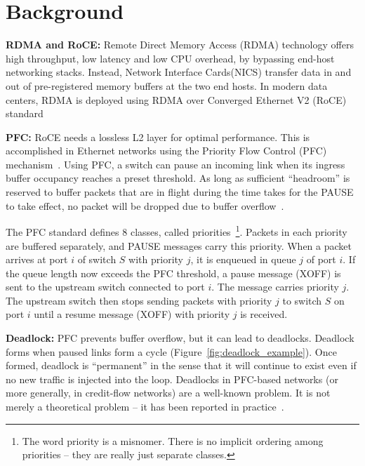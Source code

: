 \section{Background}
\label{sec:background}
{\bf RDMA and RoCE:} Remote Direct Memory Access (RDMA) technology offers high
throughput, low latency and low CPU overhead, by bypassing end-host networking
stacks. Instead, Network Interface Cards(NICS) transfer data in and out of
pre-registered memory buffers at the two end hosts.  In modern data centers,
RDMA is deployed using RDMA over Converged Ethernet V2 (RoCE)
standard~\cite{roce,rroce}

{\bf PFC:} RoCE needs a lossless L2 layer for optimal performance. This is
accomplished in Ethernet networks using the Priority Flow Control (PFC)
mechanism~\cite{pfc}.  Using PFC, a switch can pause an incoming link when its
ingress buffer occupancy reaches a preset threshold. As long as sufficient
``headroom'' is reserved to buffer packets that are in flight during the time
takes for the PAUSE to take effect, no packet will be dropped due to buffer
overflow~\cite{cisco-whitepaper,dcqcn}. 

The PFC standard defines 8 classes, called priorities~\footnote{The word priority is a
misnomer. There is no implicit ordering among priorities -- they are really just
separate classes.}. Packets in each priority are buffered separately, and PAUSE
messages carry this priority.  When a packet arrives at port $i$ of switch $S$
with priority $j$, it is enqueued in queue $j$ of port $i$. If the queue length
now exceeds the PFC threshold, a pause message (XOFF) is sent to the upstream
switch connected to port $i$. The message carries priority $j$. The upstream
switch then stops sending packets with priority $j$ to switch $S$ on port $i$ until a resume
message (XOFF) with priority $j$ is received.



{\bf Deadlock:} PFC prevents buffer overflow, but it can lead to deadlocks.
Deadlock forms when paused links form a cycle
(Figure~\ref{fig:deadlock_example}). Once formed, deadlock is ``permanent'' in
the sense that it will continue to exist even if no new traffic is injected into
the loop. Deadlocks in PFC-based networks (or more generally, in credit-flow
networks) are a well-known problem. It is not merely a theoretical problem -- it
has been reported in practice~\cite{rdmaatscale}.

